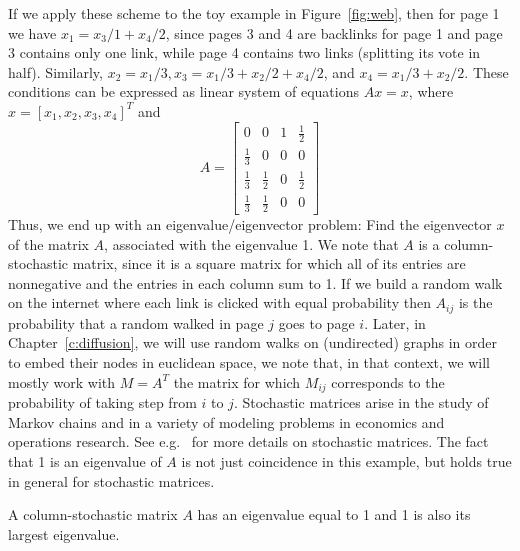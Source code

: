 If we apply these scheme to the toy example in Figure~\ref{fig:web}, then for page 1 we have
$x_1 = x_3/1 + x_4/2$,  since pages 3 and 4 are backlinks for page 1 and page 3 contains
only one link, while page 4 contains two links (splitting its vote in half). Similarly,
$x_2 = x_1/3, x_3 = x_1/3 + x_2/2 + x_4/2$, and $x_4 = x_1/3 + x_2/2$. These conditions can be expressed as linear
system of equations $Ax =x$, where $x=[x_1,x_2,x_3,x_4]^T$ and 
$$A = 
\begin{bmatrix}
0 & 0 & 1 & \frac{1}{2} \\
\frac{1}{3} & 0 & 0 & 0 \\
\frac{1}{3} & \frac{1}{2} & 0 & \frac{1}{2} \\
\frac{1}{3} & \frac{1}{2} & 0 & 0 
\end{bmatrix}
$$
Thus, we end up with an eigenvalue/eigenvector problem: Find the eigenvector $x$ of the matrix $A$, associated with the
eigenvalue 1. We note that $A$ is a column-stochastic matrix, since it is a square matrix for which all of its
entries are nonnegative and the entries in each column sum to 1. If we build a random walk on the internet where each link is clicked with equal probability then $A_{ij}$ is the probability that a random walked in page $j$ goes to page $i$. Later, in Chapter~\ref{c:diffusion}, we will use random walks on (undirected) graphs in order to embed their nodes in euclidean space, we note that, in that context, we will mostly work with $M=A^T$ the matrix for which  $M_{ij}$ corresponds to the probability of taking step from $i$ to $j$. Stochastic matrices arise in the study of Markov chains and in a variety of modeling problems in economics and
operations research.  See e.g.~\cite{HJ90} for more details on stochastic matrices. The fact that 1 is an eigenvalue of $A$ is not just coincidence in this example, but holds true in general for stochastic matrices. 

\begin{proposition}\label{prop:columnstochastichaseig1}
A column-stochastic matrix $A$ has an eigenvalue equal to 1 and 1 is also its largest eigenvalue.
\end{proposition}

